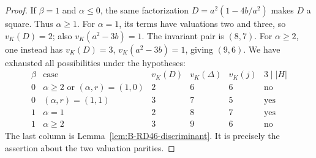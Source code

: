 \begin{proof}
If $\beta=1$ and $\alpha\le0$, the same factorization
$D=a^2(1-4b/a^2)$ makes $D$ a square. Thus $\alpha\ge1$.
For $\alpha=1$, its terms have valuations two and three,
so $v_K(D)=2$; also $v_K(a^2-3b)=1$. The invariant pair
is $(8,7)$. For $\alpha\ge2$, one instead has
$v_K(D)=3$, $v_K(a^2-3b)=1$, giving $(9,6)$.
We have exhausted all possibilities under the hypotheses:
\[
\begin{array}{c|c|c|c|c|c}
 \beta&\text{case}&v_K(D)&v_K(\Delta)&v_K(j)
       &3\mid |H|\\\hline
 0&\alpha\ge2\text{ or }(\alpha,r)=(1,0)&2&6&6&\text{no}\\
 0&(\alpha,r)=(1,1)&3&7&5&\text{yes}\\
 1&\alpha=1&2&8&7&\text{yes}\\
 1&\alpha\ge2&3&9&6&\text{no}
\end{array}                                                   \tag{B-RD47.4}
\]
The last column is Lemma~\ref{lem:B-RD46-discriminant}.
It is precisely the assertion about the two valuation parities.
\end{proof}

